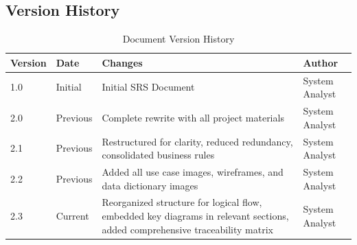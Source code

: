 \documentclass[12pt,a4paper]{article}
\begin{document}
\subsection{Version History}
\begin{table}[H]
\centering
\begin{tabular}{|p{2cm}|p{3cm}|p{4cm}|p{3cm}|}
\hline
\textbf{Version} & \textbf{Date} & \textbf{Changes} & \textbf{Author} \\
\hline
1.0 & Initial & Initial SRS Document & System Analyst \\
\hline
2.0 & Previous & Complete rewrite with all project materials & System Analyst \\
\hline
2.1 & Previous & Restructured for clarity, reduced redundancy, consolidated business rules & System Analyst \\
\hline
2.2 & Previous & Added all use case images, wireframes, and data dictionary images & System Analyst \\
\hline
2.3 & Current & Reorganized structure for logical flow, embedded key diagrams in relevant sections, added comprehensive traceability matrix & System Analyst \\
\hline
\end{tabular}
\caption{Document Version History}
\end{table}
\end{document}
